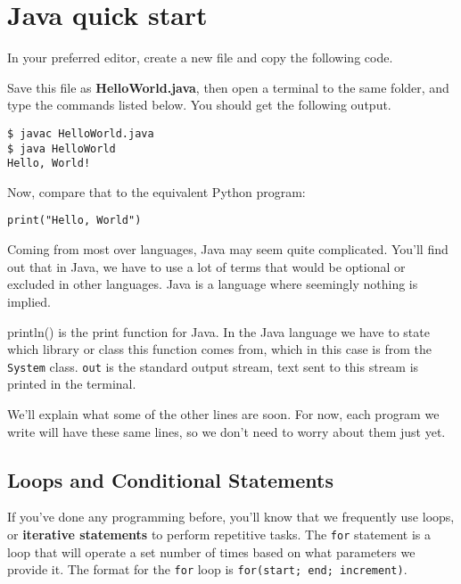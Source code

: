 \section{Java quick start}

	In your preferred editor, create a new file and copy the following code.
	
	
	
	Save this file as \textbf{HelloWorld.java}, then open a terminal to the same folder, and type the commands listed below. You should get the following output.
	
	\begin{lstlisting}[style=Terminal]
$ javac HelloWorld.java
$ java HelloWorld
Hello, World!
	\end{lstlisting}
	
	Now, compare that to the equivalent Python program:
	
	\begin{lstlisting}[style=Python]
print("Hello, World")
	\end{lstlisting}
	
	Coming from most over languages, Java may seem quite complicated. You'll find out that in Java, we have to use a lot of terms that would be optional or excluded in other languages. Java is a language where seemingly nothing is implied.
	
	\begin{aside}[println()]
		println() is the print function for Java. In the Java language we have to state which library or class this function comes from, which in this case is from the \texttt{System} class. \texttt{out} is the standard output stream, text sent to this stream is printed in the terminal.
	\end{aside}
	
	We'll explain what some of the other lines are soon. For now, each program we write will have these same lines, so we don't need to worry about them just yet.
	
	\subsection{Loops and Conditional Statements}
	
		If you've done any programming before, you'll know that we frequently use loops, or \textbf{iterative statements} to perform repetitive tasks. The \texttt{for} statement is a loop that will operate a set number of times based on what parameters we provide it.
		The format for the \texttt{for} loop is \mbox{\texttt{for(start; end; increment)}}.
		
